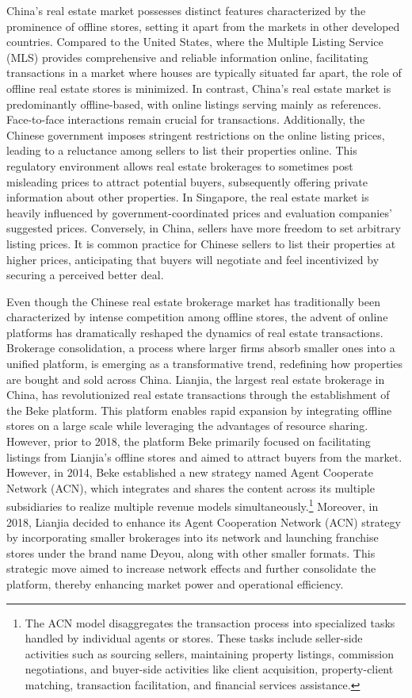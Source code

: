\documentclass[11pt]{article}
\begin{document}
China's real estate market possesses distinct features characterized by the prominence of offline stores, setting it apart from the markets in other developed countries. Compared to the United States, where the Multiple Listing Service (MLS) provides comprehensive and reliable information online, facilitating transactions in a market where houses are typically situated far apart, the role of offline real estate stores is minimized. In contrast, China's real estate market is predominantly offline-based, with online listings serving mainly as references. Face-to-face interactions remain crucial for transactions. Additionally, the Chinese government imposes stringent restrictions on the online listing prices, leading to a reluctance among sellers to list their properties online. This regulatory environment allows real estate brokerages to sometimes post misleading prices to attract potential buyers, subsequently offering private information about other properties. In Singapore, the real estate market is heavily influenced by government-coordinated prices and evaluation companies' suggested prices. Conversely, in China, sellers have more freedom to set arbitrary listing prices. It is common practice for Chinese sellers to list their properties at higher prices, anticipating that buyers will negotiate and feel incentivized by securing a perceived better deal.

Even though the Chinese real estate brokerage market has traditionally been characterized by intense competition among offline stores, the advent of online platforms has dramatically reshaped the dynamics of real estate transactions. Brokerage consolidation, a process where larger firms absorb smaller ones into a unified platform, is emerging as a transformative trend, redefining how properties are bought and sold across China. Lianjia, the largest real estate brokerage in China, has revolutionized real estate transactions through the establishment of the Beke platform. This platform enables rapid expansion by integrating offline stores on a large scale while leveraging the advantages of resource sharing. However, prior to 2018, the platform Beke primarily focused on facilitating listings from Lianjia's offline stores and aimed to attract buyers from the market. However, in 2014, Beke established a new strategy named Agent Cooperate Network (ACN), which integrates and shares the content across its multiple subsidiaries to realize multiple revenue models simultaneously.\footnote{The ACN model disaggregates the transaction process into specialized tasks handled by individual agents or stores. These tasks include seller-side activities such as sourcing sellers, maintaining property listings, commission negotiations, and buyer-side activities like client acquisition, property-client matching, transaction facilitation, and financial services assistance.} Moreover, in 2018, Lianjia decided to enhance its Agent Cooperation Network (ACN) strategy by incorporating smaller brokerages into its network and launching franchise stores under the brand name Deyou, along with other smaller formats. This strategic move aimed to increase network effects and further consolidate the platform, thereby enhancing market power and operational efficiency.
\end{document}
